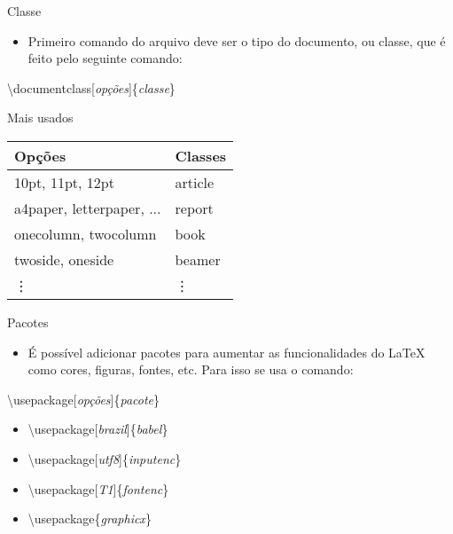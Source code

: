 \documentclass{beamer}
\begin{document}
\begin{frame}[allowframebreaks]{Classe}
	\begin{itemize}
	\item Primeiro comando do arquivo deve ser o tipo do documento, ou classe, que é feito pelo seguinte comando:
	\end{itemize}

	\alert{\textbackslash documentclass[\textit{opções}]\{\textit{classe}\}}

	\vspace{.5cm}
	
	\begin{block}{Mais usados}
		\begin{center}
		\begin{tabular}{|l|l|}
		\hline
		{\bf Opções}				& {\bf Classes} \\
		\hline
		10pt, 11pt, 12pt			& article		\\
		a4paper, letterpaper, ...	& report		\\
		onecolumn, twocolumn		& book			\\
		twoside, oneside			& beamer		\\
		\vdots						& \vdots		\\
		\hline
		\end{tabular}
		\end{center}
	\end{block}
\end{frame}

\begin{frame}{Pacotes}
	\begin{itemize}
	\item É possível adicionar pacotes para aumentar as funcionalidades do \LaTeX\, como cores, figuras, fontes, etc. Para isso	se usa o comando:
	\end{itemize}

	\alert{\textbackslash usepackage[\textit{opções}]\{\textit{pacote}\}}

	\vspace{.5cm}

	\begin{example}
		\begin{itemize}
		\item \textbackslash usepackage[\textit{brazil}]\{\textit{babel}\}
		\item \textbackslash usepackage[\textit{utf8}]\{\textit{inputenc}\}
		\item \textbackslash usepackage[\textit{T1}]\{\textit{fontenc}\}
		\item \textbackslash usepackage\{\textit{graphicx}\}
		\end{itemize}
	\end{example}
\end{frame}
\end{document}
